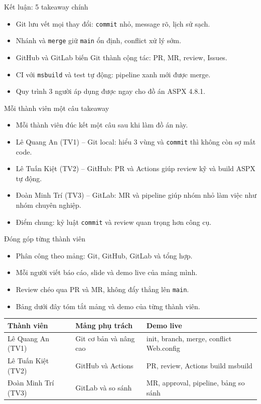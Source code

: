 \begin{frame}{Kết luận: 5 takeaway chính}
\begin{itemize}
\item Git lưu vết mọi thay đổi: \texttt{commit} nhỏ, message rõ, lịch sử sạch.
\item Nhánh và \texttt{merge} giữ \texttt{main} ổn định, conflict xử lý sớm.
\item GitHub và GitLab biến Git thành cộng tác: PR, MR, review, Issues.
\item CI với \texttt{msbuild} và test tự động: pipeline xanh mới được merge.
\item Quy trình 3 người áp dụng được ngay cho đồ án ASPX 4.8.1.
\end{itemize}
\end{frame}

\begin{frame}{Mỗi thành viên một câu takeaway}
\begin{itemize}
\item Mỗi thành viên đúc kết một câu sau khi làm đồ án này.
\item Lê Quang An (TV1) -- Git local: hiểu 3 vùng và \texttt{commit} thì không còn sợ mất code.
\item Lê Tuấn Kiệt (TV2) -- GitHub: PR và Actions giúp review kỹ và build ASPX tự động.
\item Đoàn Minh Trí (TV3) -- GitLab: MR và pipeline giúp nhóm nhỏ làm việc như nhóm chuyên nghiệp.
\item Điểm chung: kỷ luật \texttt{commit} và review quan trọng hơn công cụ.
\end{itemize}
\end{frame}

\begin{frame}{Đóng góp từng thành viên}
\begin{itemize}
\item Phân công theo mảng: Git, GitHub, GitLab và tổng hợp.
\item Mỗi người viết báo cáo, slide và demo live của mảng mình.
\item Review chéo qua PR và MR, không đẩy thẳng lên \texttt{main}.
\item Bảng dưới đây tóm tắt mảng và demo của từng thành viên.
\end{itemize}
{\footnotesize
\begin{tabular}{lll}
\toprule
Thành viên & Mảng phụ trách & Demo live \\
\midrule
Lê Quang An (TV1) & Git cơ bản và nâng cao & init, branch, merge, conflict Web.config \\
Lê Tuấn Kiệt (TV2) & GitHub và Actions & PR, review, Actions build msbuild \\
Đoàn Minh Trí (TV3) & GitLab và so sánh & MR, approval, pipeline, bảng so sánh \\
\bottomrule
\end{tabular}
}
\end{frame}

